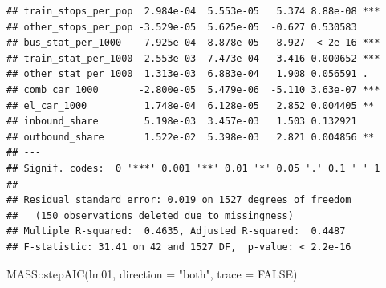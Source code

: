 \documentclass[
]{article}
\newenvironment{Shaded}{\begin{snugshade}}{\end{snugshade}}
\newcommand{\AttributeTok}[1]{\textcolor[rgb]{0.77,0.63,0.00}{#1}}
\newcommand{\ConstantTok}[1]{\textcolor[rgb]{0.00,0.00,0.00}{#1}}
\newcommand{\FunctionTok}[1]{\textcolor[rgb]{0.00,0.00,0.00}{#1}}
\newcommand{\NormalTok}[1]{#1}
\newcommand{\SpecialCharTok}[1]{\textcolor[rgb]{0.00,0.00,0.00}{#1}}
\newcommand{\StringTok}[1]{\textcolor[rgb]{0.31,0.60,0.02}{#1}}
\begin{document}
\begin{verbatim}
## train_stops_per_pop  2.984e-04  5.553e-05   5.374 8.88e-08 ***
## other_stops_per_pop -3.529e-05  5.625e-05  -0.627 0.530583    
## bus_stat_per_1000    7.925e-04  8.878e-05   8.927  < 2e-16 ***
## train_stat_per_1000 -2.553e-03  7.473e-04  -3.416 0.000652 ***
## other_stat_per_1000  1.313e-03  6.883e-04   1.908 0.056591 .  
## comb_car_1000       -2.800e-05  5.479e-06  -5.110 3.63e-07 ***
## el_car_1000          1.748e-04  6.128e-05   2.852 0.004405 ** 
## inbound_share        5.198e-03  3.457e-03   1.503 0.132921    
## outbound_share       1.522e-02  5.398e-03   2.821 0.004856 ** 
## ---
## Signif. codes:  0 '***' 0.001 '**' 0.01 '*' 0.05 '.' 0.1 ' ' 1
## 
## Residual standard error: 0.019 on 1527 degrees of freedom
##   (150 observations deleted due to missingness)
## Multiple R-squared:  0.4635, Adjusted R-squared:  0.4487 
## F-statistic: 31.41 on 42 and 1527 DF,  p-value: < 2.2e-16
\end{verbatim}

\begin{Shaded}
\begin{Highlighting}[]
\NormalTok{MASS}\SpecialCharTok{::}\FunctionTok{stepAIC}\NormalTok{(lm01, }\AttributeTok{direction =} \StringTok{"both"}\NormalTok{, }\AttributeTok{trace =} \ConstantTok{FALSE}\NormalTok{)}
\end{Highlighting}
\end{Shaded}
\end{document}
